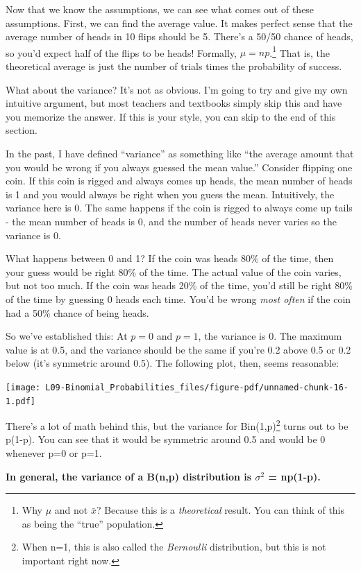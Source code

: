 \documentclass[
  letterpaper,
  DIV=11,
  numbers=noendperiod]{scrreprt}
\begin{document}
Now that we know the assumptions, we can see what comes out of these
assumptions. First, we can find the average value. It makes perfect
sense that the average number of heads in 10 flips should be 5. There's
a 50/50 chance of heads, so you'd expect half of the flips to be heads!
Formally, \(\mu = np\).\footnote{Why \(\mu\) and not \(\bar x\)? Because
  this is a \emph{theoretical} result. You can think of this as being
  the ``true'' population.} That is, the theoretical average is just the
number of trials times the probability of success.

What about the variance? It's not as obvious. I'm going to try and give
my own intuitive argument, but most teachers and textbooks simply skip
this and have you memorize the answer. If this is your style, you can
skip to the end of this section.

In the past, I have defined ``variance'' as something like ``the average
amount that you would be wrong if you always guessed the mean value.''
Consider flipping one coin. If this coin is rigged and always comes up
heads, the mean number of heads is 1 and you would always be right when
you guess the mean. Intuitively, the variance here is 0. The same
happens if the coin is rigged to always come up tails - the mean number
of heads is 0, and the number of heads never varies so the variance is
0.

What happens between 0 and 1? If the coin was heads 80\% of the time,
then your guess would be right 80\% of the time. The actual value of the
coin varies, but not too much. If the coin was heads 20\% of the time,
you'd still be right 80\% of the time by guessing 0 heads each time.
You'd be wrong \emph{most often} if the coin had a 50\% chance of being
heads.

So we've established this: At \(p=0\) and \(p=1\), the variance is 0.
The maximum value is at 0.5, and the variance should be the same if
you're 0.2 above 0.5 or 0.2 below (it's symmetric around 0.5). The
following plot, then, seems reasonable:

\texttt{[image: L09-Binomial\_Probabilities\_files/figure-pdf/unnamed-chunk-16-1.pdf]}

There's a lot of math behind this, but the variance for
Bin(1,p)\footnote{When n=1, this is also called the \emph{Bernoulli}
  distribution, but this is not important right now.} turns out to be
p(1-p). You can see that it would be symmetric around 0.5 and would be 0
whenever p=0 or p=1.

\textbf{In general, the variance of a B(n,p) distribution is
\(\sigma^2\) = np(1-p).}
\end{document}
